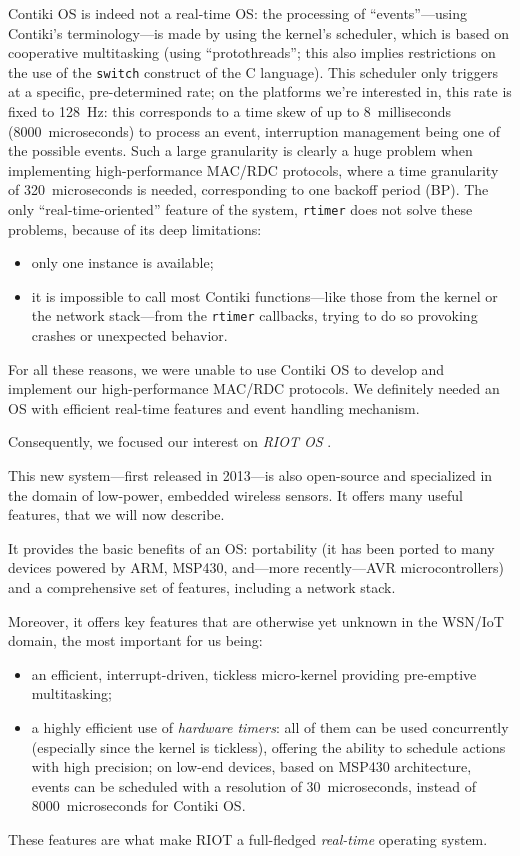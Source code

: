\documentclass[conference]{IEEEtran}
\begin{document}
Contiki OS is indeed not a real-time OS: the processing of ``events''---using
Contiki's terminology---is made by using the kernel's scheduler, which is
based on cooperative multitasking (using ``protothreads''; this also implies
restrictions on the use of the \texttt{switch} construct of the C language).
This scheduler only triggers at a specific, pre-determined rate; on
the platforms we're interested in, this rate is fixed to 128~Hz:
this corresponds to a time skew of up to 8~milliseconds
(8000~microseconds) to process an event, interruption management being
one of the possible events. Such a large granularity is clearly
a huge problem when implementing high-performance MAC/RDC protocols,
where a time granularity of 320~microseconds is needed, corresponding
to one backoff period (BP). The only ``real-time-oriented'' feature
of the system, \texttt{rtimer} does not solve these problems, because
of its deep limitations:
\begin{itemize}
\item only one instance is available;
\item it is impossible to call most Contiki functions---like those from
the kernel or the network stack---from the \texttt{rtimer} callbacks,
trying to do so provoking crashes or unexpected behavior.
\end{itemize}

For all these reasons, we were unable to use Contiki OS to develop and
implement our high-performance MAC/RDC protocols. We definitely needed
an OS with efficient real-time features and event handling mechanism.

\bigskip

Consequently, we focused our interest on \emph{RIOT OS} \cite{RIOT}.

This new system---first released in 2013---is also open-source and
specialized in the domain of low-power, embedded wireless sensors.
It offers many useful features, that we will now describe.

It provides the basic benefits of an OS: portability (it has been ported
to many devices powered by ARM, MSP430, and---more recently---AVR
microcontrollers) and a comprehensive set of features, including
a network stack.

Moreover, it offers key features that are otherwise yet unknown in
the WSN/IoT domain, the most important for us being:
\begin{itemize}
\item an efficient, interrupt-driven, tickless micro-kernel providing
      pre-emptive multitasking;
\item a highly efficient use of \emph{hardware timers}: all of them can be
      used concurrently (especially since the kernel is tickless), offering
      the ability to schedule actions with high precision; on low-end
      devices, based on MSP430 architecture, events can be scheduled
      with a resolution of 30~microseconds, instead of 8000~microseconds
      for Contiki OS.
\end{itemize}
These features are what make RIOT a full-fledged \emph{real-time} operating
system.
\end{document}
